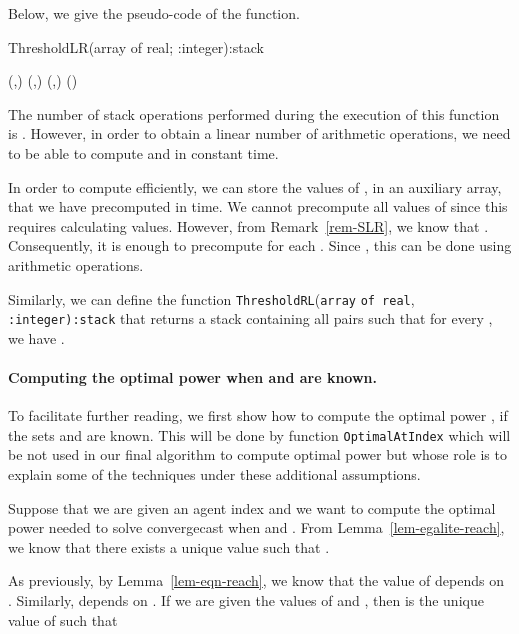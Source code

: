 \documentclass{article}
\newcommand\CompOptimalPos{{{\tt Optimal\-At\-Index}}\xspace}
\newcommand\CompThRL{\mbox{{\tt ThresholdRL}}\xspace}
\newcommand\convergecast{convergecast\xspace}
\begin{document}
Below, we give the pseudo-code of the function.

\begin{function}[H]
\caption{ThresholdLR(array {} of real; :integer):stack}\label{algo:cmptTH-s}  
  
 

\;
\Push(,)\;
\For{ \KwTo }
{
  \While{} 
        {\;}
  \Push(,)\;
  \;
  \Push(,)\;
}
\Return()\;
\end{function}

The number of stack operations performed during the execution of this
function is . However, in order to obtain a linear number of
arithmetic operations, we need to be able to compute  and
 in constant time.

In order to compute  efficiently, we can store the values of
,  in an auxiliary array, that we have precomputed
in  time. We cannot precompute all values of  since
this requires calculating  values. However, from
Remark~\ref{rem-SLR}, we know that . Consequently, it is enough to precompute
 for each . Since , this can be done using  arithmetic
operations.




Similarly, we can define the function \CompThRL(\texttt{array}
 \texttt{of real}, \texttt{:integer):stack} that returns
a stack  containing all pairs  such
that for every , we have .


\paragraph{Computing the optimal power when  and  are known.} 

To facilitate further reading, we first show how to compute the optimal power ,
if the sets  and  are known. This will be done by function \CompOptimalPos which will be not used in our final algorithm to compute optimal power but whose role is to explain some of the techniques under these additional assumptions.

Suppose that we are given an agent index  and we want to
compute the optimal power needed to solve {\convergecast} when  and . From
Lemma~\ref{lem-egalite-reach}, we know that there exists a unique value
 such that .

As previously, by Lemma~\ref{lem-eqn-reach}, we know that the value
of  depends on . Similarly,  depends
on .  If we are
given the values of  and , then  is the unique value of 
such that
 
\end{document}
